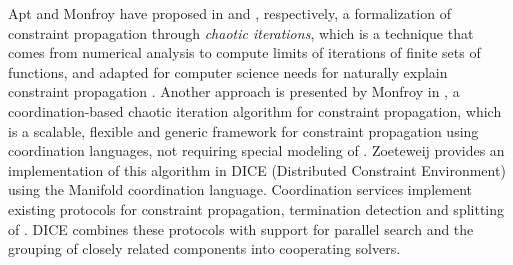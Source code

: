 

Apt and Monfroy have proposed in \cite{Apt} and \cite{Monfroy}, respectively, a formalization of constraint propagation through \textit{chaotic iterations}, which is a technique that comes from numerical analysis to compute limits of iterations of finite sets of functions, and adapted for computer science needs for naturally explain constraint propagation \cite{Chazan1969, Cousot1977}. Another approach is presented by Monfroy in \cite{Monfroy2000}, a coordination-based chaotic iteration algorithm for constraint propagation, which is a scalable, flexible and generic framework for constraint propagation using coordination languages, not requiring special modeling of \csps. Zoeteweij provides an implementation of this algorithm in {\sc DICE} (Distributed Constraint Environment) \cite{Zoeteweij2003} using the {\sc Manifold} coordination language. Coordination services implement existing protocols for constraint propagation, termination detection and splitting of \csps. {\sc DICE} combines these protocols with support for parallel search and the grouping of closely related components into cooperating solvers.

